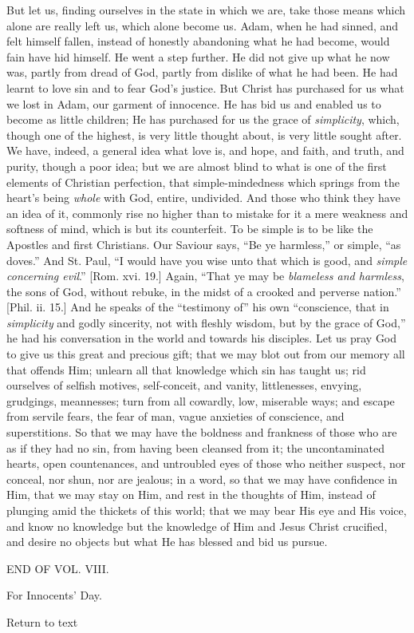 But let us, finding ourselves in the state in which we are, take
those means which alone are really left us, which alone become us.
Adam, when he had sinned, and felt himself fallen, instead of honestly
abandoning what he had become, would fain have hid himself. He went a
step further. He did not give up what he now was, partly from dread of
God, partly from dislike of what he had been. He had learnt to love
sin and to fear God's justice. But Christ has purchased for us what we
lost in Adam, our garment of innocence. He has bid us and enabled us
to become as little children; He has purchased for us the grace of \emph{simplicity},
which, though one of the highest, is very little thought about, is
very little sought after. We have, indeed, a general idea what love
is, and hope, and faith, and truth, and purity, though a poor idea;
but we are almost blind to what is one of the first elements of
Christian perfection, that simple-mindedness which springs from the
heart's being \emph{whole} with God, entire, undivided. And those who
think they have an idea of it, commonly rise no higher than to mistake
for it a mere weakness and softness of mind, which is but its
counterfeit. To be simple is to be like the Apostles and first
Christians. Our Saviour says, ``Be ye harmless,'' or simple,
``as doves.'' And St. Paul, ``I would have you wise unto
that which is good, and \emph{simple concerning evil}.'' [Rom.
xvi. 19.] Again, ``That ye may be \emph{blameless and harmless},
the sons of God, without rebuke, in the midst of a crooked and
perverse nation.'' [Phil. ii. 15.] And he speaks of the
``testimony of'' his own ``conscience, that in \emph{simplicity}
and godly sincerity, not with fleshly wisdom, but by the grace of
God,'' he had his conversation in the world and towards his
disciples. Let us pray God to give us this great and precious gift;
that we may blot out from our memory all that offends Him; unlearn all
that knowledge which sin has taught us; rid ourselves of selfish
motives, self-conceit, and vanity, littlenesses, envying, grudgings,
meannesses; turn from all cowardly, low, miserable ways; and escape
from servile fears, the fear of man, vague anxieties of conscience,
and superstitions. So that we may have the boldness and frankness of
those who are as if they had no sin, from having been cleansed from
it; the uncontaminated hearts, open countenances, and untroubled eyes
of those who neither suspect, nor conceal, nor shun, nor are jealous;
in a word, so that we may have confidence in Him, that we may stay on
Him, and rest in the thoughts of Him, instead of plunging amid the
thickets of this world; that we may bear His eye and His voice, and
know no knowledge but the knowledge of Him and Jesus Christ crucified,
and desire no objects but what He has blessed and bid us pursue.

END OF VOL. VIII.


For Innocents' Day.

Return to text
